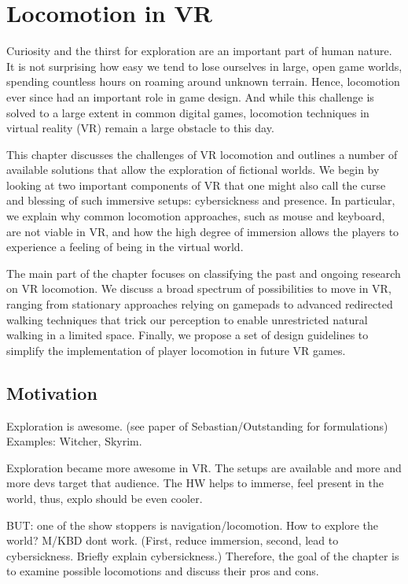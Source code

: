 \chapter{Locomotion in VR}
\label{sec:locomotion}


Curiosity and the thirst for exploration are an important part of human nature. It is not surprising how easy we tend to lose ourselves in large, open game worlds, spending countless hours on roaming around unknown terrain. Hence, locomotion  ever since had an important role in game design. And while this challenge is solved to a large extent in common digital games, locomotion techniques in virtual reality (VR) remain a large obstacle to this day.

This chapter discusses the challenges of VR locomotion and outlines a number of available solutions that allow the exploration of fictional worlds. We begin by looking at two important components of VR that one might also call the curse and blessing of such immersive setups: cybersickness and presence. In particular, we explain why common locomotion approaches, such as mouse and keyboard, are not viable in VR, and how the high degree of immersion allows the players to experience a feeling of being in the virtual world.

The main part of the chapter focuses on classifying the past and ongoing research on VR locomotion. We discuss a broad spectrum of possibilities to move in VR, ranging from stationary approaches relying on gamepads to advanced redirected walking techniques that trick our perception to enable unrestricted natural walking in a limited space. Finally, we propose a set of design guidelines to simplify the implementation of player locomotion in future VR games.




\section{Motivation}

Exploration is awesome. (see paper of Sebastian/Outstanding for formulations)
Examples: Witcher, Skyrim.

Exploration became more awesome in VR. The setups are available and more and more devs target that audience. The HW helps to immerse, feel present in the world, thus, explo should be even cooler.

BUT: one of the show stoppers is navigation/locomotion. How to explore the world? M/KBD dont work. (First, reduce immersion, second, lead to cybersickness. Briefly explain cybersickness.)
Therefore, the goal of the chapter is to examine possible locomotions and discuss their pros and cons.

